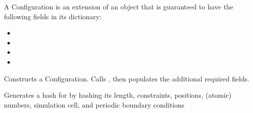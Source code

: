 \documentclass[letterpaper,10pt,english]{sphinxmanual}
\begin{document}
\begin{fulllineitems}
\label{\detokenize{configuration:colabfit.tools.configuration.Configuration}}
\sphinxAtStartPar
A Configuration is an extension of an  object that is
guaranteed to have the following fields in its  dictionary:
\begin{itemize}
\item {} 
\sphinxAtStartPar
{}

\item {} 
\sphinxAtStartPar
{}

\item {} 
\sphinxAtStartPar
{}

\item {} 
\sphinxAtStartPar
{}

\end{itemize}

\sphinxAtStartPar
Constructs a Configuration. Calls , then
populates the additional required fields.

\begin{fulllineitems}
\label{\detokenize{configuration:colabfit.tools.configuration.Configuration.__hash__}}
\sphinxAtStartPar
Generates a hash for  by hashing its length, constraints,
positions, (atomic) numbers, simulation cell, and periodic
boundary conditions

\end{fulllineitems}



\end{fulllineitems}
\end{document}
